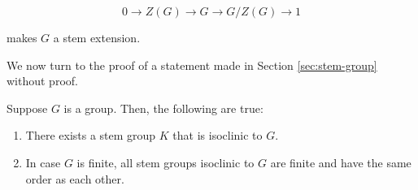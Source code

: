 \documentclass{ucetd}
\begin{document}
$$0 \to Z(G) \to G \to G/Z(G) \to 1$$

makes $G$ a stem extension.

We now turn to the proof of a statement made in Section
\ref{sec:stem-group} without proof.

\begin{theorem}\label{thm:stem-group-existence}
  Suppose $G$ is a group. Then, the following are true:

  \begin{enumerate}
  \item There exists a stem group $K$ that is isoclinic to $G$.
  \item In case $G$ is finite, all stem groups isoclinic to $G$ are
    finite and have the same order as each other.
  \end{enumerate}
\end{theorem}
\end{document}
